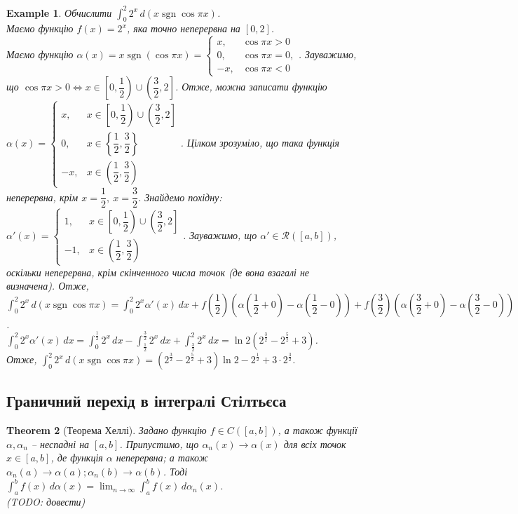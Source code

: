 \documentclass[a4paper, 10pt]{article}
\DeclareMathOperator\sign{sgn}
\theoremstyle{theoremdd}
\newtheorem{theorem}{Theorem}[subsection]
\theoremstyle{theoremdd}
\theoremstyle{theoremdd}
\theoremstyle{theoremdd}
\theoremstyle{theoremdd}
\newtheorem{example}[theorem]{Example}
\theoremstyle{theoremdd}
\theoremstyle{theoremdd}
\theoremstyle{theoremdd}
\theoremstyle{theoremdd}
\begin{document}
\begin{example}
Обчислити $\displaystyle\int_0^2 2^x\,d(x \sign \cos \pi x)$.\\
Маємо функцію $f(x) = 2^x$, яка точно неперервна на $[0,2]$. \\
Маємо функцію $\alpha(x) = x \sign (\cos \pi x) = \begin{cases} x, & \cos \pi x > 0 \\ 0, & \cos \pi x = 0, \\ -x, & \cos \pi x < 0 \end{cases}$. Зауважимо, що $\cos \pi x > 0 \iff x \in \left[0,\dfrac{1}{2}\right) \cup \left(\dfrac{3}{2},2\right]$. Отже, можна записати функцію $\alpha(x) = \begin{cases} x, & x \in \left[0,\dfrac{1}{2}\right) \cup \left(\dfrac{3}{2},2\right] \\ 0, & x \in \left\{\dfrac{1}{2},\dfrac{3}{2}\right\} \\ -x, & x \in \left(\dfrac{1}{2},\dfrac{3}{2}\right) \end{cases}$. Цілком зрозуміло, що така функція неперервна, крім $x = \dfrac{1}{2},\ x = \dfrac{3}{2}$. Знайдемо похідну:\\
$\alpha'(x) = \begin{cases} 1, & x \in \left[0,\dfrac{1}{2}\right) \cup \left(\dfrac{3}{2},2\right] \\ -1, & x \in \left(\dfrac{1}{2},\dfrac{3}{2}\right) \end{cases}$. Зауважимо, що $\alpha' \in \mathcal{R}([a,b])$, оскільки неперервна, крім скінченного числа точок (де вона взагалі не визначена). Отже,\\
$\displaystyle\int_0^2 2^x \,d(x \sign \cos \pi x) = \int_0^2 2^x \alpha'(x)\,dx + f\left(\dfrac{1}{2}\right) \left( \alpha\left(\dfrac{1}{2}+0\right) - \alpha\left(\dfrac{1}{2}-0\right) \right) + f\left(\dfrac{3}{2}\right) \left( \alpha\left(\dfrac{3}{2}+0\right) - \alpha\left(\dfrac{3}{2}-0\right) \right)$.\\
$\displaystyle\int_0^2 2^x \alpha'(x)\,dx = \int_0^{\frac{1}{2}}2^x\,dx - \int_{\frac{1}{2}}^{\frac{3}{2}}2^x\,dx + \int_{\frac{3}{2}}^2 2^x\,dx = \ln 2 (2^{\frac{3}{2}} - 2^{\frac{5}{2}} + 3)$.\\
Отже, $\displaystyle\int_0^2 2^x\,d(x \sign \cos \pi x) = (2^{\frac{3}{2}} - 2^{\frac{5}{2}} + 3) \ln 2 - 2^{\frac{1}{2}} + 3 \cdot 2^{\frac{3}{2}}$.
\end{example}

\subsection{Граничний перехід в інтегралі Стілтьєса}
\begin{theorem}[Теорема Хеллі]
Задано функцію $f \in C([a,b])$, а також функції $\alpha, \alpha_n$ -- неспадні на $[a,b]$. Припустимо, що $\alpha_n(x) \to \alpha(x)$ для всіх точок $x \in [a,b]$, де функція $\alpha$ неперервна; а також $\alpha_n(a) \to \alpha(a); \alpha_n(b) \to \alpha(b)$. Тоді $\displaystyle\int_a^b f(x)\,d\alpha(x) = \lim_{n \to \infty} \int_a^b f(x)\,d\alpha_n(x)$.\\
(TODO: довести)
\end{theorem}
\end{document}

